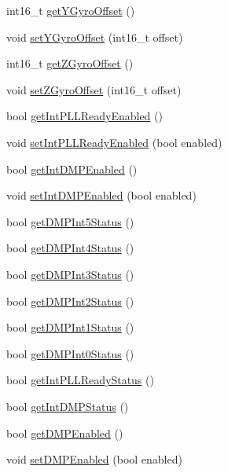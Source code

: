 \begin{DoxyCompactItemize}
\item 
int16\+\_\+t \hyperlink{classMPU6050_a1874f796bd3ad97c5a72ab559b33e4a7}{get\+Y\+Gyro\+Offset} ()
\item 
void \hyperlink{classMPU6050_a9a725bf3be4e1a74e5f655194bf22bde}{set\+Y\+Gyro\+Offset} (int16\+\_\+t offset)
\item 
int16\+\_\+t \hyperlink{classMPU6050_aec9b1f7b83d8850858f4200b3afa79fd}{get\+Z\+Gyro\+Offset} ()
\item 
void \hyperlink{classMPU6050_aacf6f5599adbfb8ec685f2b96db6905e}{set\+Z\+Gyro\+Offset} (int16\+\_\+t offset)
\item 
bool \hyperlink{classMPU6050_a4d02c38682aa566b6204df3f81fbcb68}{get\+Int\+P\+L\+L\+Ready\+Enabled} ()
\item 
void \hyperlink{classMPU6050_aef44106927c1b986588f36bffaebea54}{set\+Int\+P\+L\+L\+Ready\+Enabled} (bool enabled)
\item 
bool \hyperlink{classMPU6050_a3af3f3c0a16b5b68cf6301cb0ac3f392}{get\+Int\+D\+M\+P\+Enabled} ()
\item 
void \hyperlink{classMPU6050_a889d29900cb0dd16e0199c13822f0f88}{set\+Int\+D\+M\+P\+Enabled} (bool enabled)
\item 
bool \hyperlink{classMPU6050_a3a86756b7fe164e454f4801c30cdbffe}{get\+D\+M\+P\+Int5\+Status} ()
\item 
bool \hyperlink{classMPU6050_a9d406fd5027e7a6b0e33f5bfafc67627}{get\+D\+M\+P\+Int4\+Status} ()
\item 
bool \hyperlink{classMPU6050_a1ac1a70c4d207c93359b43e743d34839}{get\+D\+M\+P\+Int3\+Status} ()
\item 
bool \hyperlink{classMPU6050_acaf41d1789aa02814af0319f71c57a9f}{get\+D\+M\+P\+Int2\+Status} ()
\item 
bool \hyperlink{classMPU6050_a82a5a98ad80c69209ef0f423287b2f76}{get\+D\+M\+P\+Int1\+Status} ()
\item 
bool \hyperlink{classMPU6050_a2b597f3f6b4188cbdb3feb2cd8dd3469}{get\+D\+M\+P\+Int0\+Status} ()
\item 
bool \hyperlink{classMPU6050_a559de8cd420d329c93f215938e8483e2}{get\+Int\+P\+L\+L\+Ready\+Status} ()
\item 
bool \hyperlink{classMPU6050_a715e66c52a2272b54782058772b50d61}{get\+Int\+D\+M\+P\+Status} ()
\item 
bool \hyperlink{classMPU6050_a2a17e3062b1f321d260fd70f308c6a06}{get\+D\+M\+P\+Enabled} ()
\item 
void \hyperlink{classMPU6050_abb6bf6db86b84700c7f13bd838d63755}{set\+D\+M\+P\+Enabled} (bool enabled)

\end{DoxyCompactItemize}
